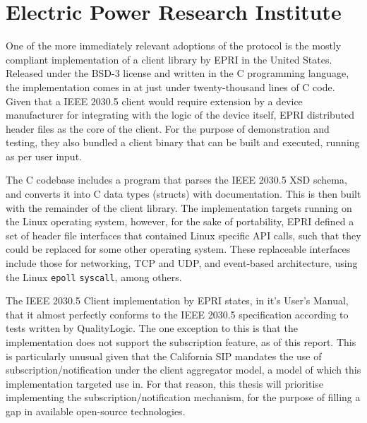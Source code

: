\section{Electric Power Research Institute}
One of the more immediately relevant adoptions of the protocol is the mostly compliant implementation of a client library by EPRI in the United States.
Released under the BSD-3 license and written in the C programming language, the implementation comes in at just under twenty-thousand lines of C code.
Given that a IEEE 2030.5 client would require extension by a device manufacturer for integrating with the logic of the device itself, EPRI distributed header files as the core of the client.
For the purpose of demonstration and testing, they also bundled a client binary that can be built and executed, running as per user input.

The C codebase includes a program that parses the IEEE 2030.5 XSD schema, and converts it into C data types (structs) with documentation. This is then built with the remainder of the client library.
The implementation targets running on the Linux operating system, however, for the sake of portability, EPRI defined a set of header file interfaces that contained Linux specific API calls, such that they could be replaced for some other operating system.
These replaceable interfaces include those for networking, TCP and UDP, and event-based architecture, using the Linux \texttt{epoll} \texttt{syscall}, among others.

The IEEE 2030.5 Client implementation by EPRI states, in it's User's Manual, that it almost perfectly conforms to the IEEE 2030.5 specification according to tests written by QualityLogic.
The one exception to this is that the implementation does not support the subscription feature, as of this report.
This is particularly unusual given that the California SIP mandates the use of subscription/notification under the client aggregator model, a model of which this implementation targeted use in.
For that reason, this thesis will prioritise implementing the subscription/notification mechanism, for the purpose of filling a gap in available open-source technologies.
\cite[]{eprimanual}





